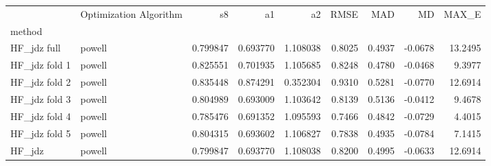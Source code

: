 \begin{tabular}{llrrrrrrr}
 & Optimization Algorithm & s8 & a1 & a2 & RMSE & MAD & MD & MAX_E \\
method &  &  &  &  &  &  &  &  \\
HF_jdz full & powell & 0.799847 & 0.693770 & 1.108038 & 0.8025 & 0.4937 & -0.0678 & 13.2495 \\
HF_jdz fold 1 & powell & 0.825551 & 0.701935 & 1.105685 & 0.8248 & 0.4780 & -0.0468 & 9.3977 \\
HF_jdz fold 2 & powell & 0.835448 & 0.874291 & 0.352304 & 0.9310 & 0.5281 & -0.0770 & 12.6914 \\
HF_jdz fold 3 & powell & 0.804989 & 0.693009 & 1.103642 & 0.8139 & 0.5136 & -0.0412 & 9.4678 \\
HF_jdz fold 4 & powell & 0.785476 & 0.691352 & 1.095593 & 0.7466 & 0.4842 & -0.0729 & 4.4015 \\
HF_jdz fold 5 & powell & 0.804315 & 0.693602 & 1.106827 & 0.7838 & 0.4935 & -0.0784 & 7.1415 \\
HF_jdz & powell & 0.799847 & 0.693770 & 1.108038 & 0.8200 & 0.4995 & -0.0633 & 12.6914 \\
\end{tabular}
